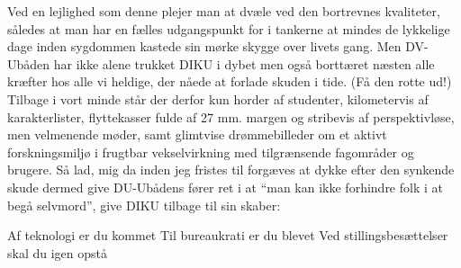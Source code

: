 \documentclass[a4paper,11pt]{article}
\begin{document}
\begin{sketch}
 Ved en lejlighed som denne plejer man at dvæle ved den bortrevnes kvaliteter, således at man har en fælles udgangspunkt for i tankerne at mindes de lykkelige dage inden sygdommen kastede sin mørke skygge over livets gang.  Men DV-Ubåden har ikke alene trukket DIKU i dybet men også borttæret næsten alle kræfter hos alle vi heldige, der nåede at forlade skuden i tide. (Få den rotte ud!)  Tilbage i vort minde står der derfor kun horder af studenter, kilometervis af karakterlister, flyttekasser fulde af 27 mm. margen og stribevis af perspektivløse, men velmenende møder, samt glimtvise drømmebilleder om et aktivt forskningsmiljø i frugtbar vekselvirkning med tilgrænsende fagområder og brugere.  Så lad, mig da inden jeg fristes til forgæves at dykke efter den synkende skude dermed give DU-Ubådens fører ret i at ``man kan ikke forhindre folk i at begå selvmord'', give DIKU tilbage til sin skaber:

 Af teknologi er du kommet 
 Til bureaukrati er du blevet 
 Ved stillingsbesættelser skal du igen opstå 

\end{sketch}
\end{document}
